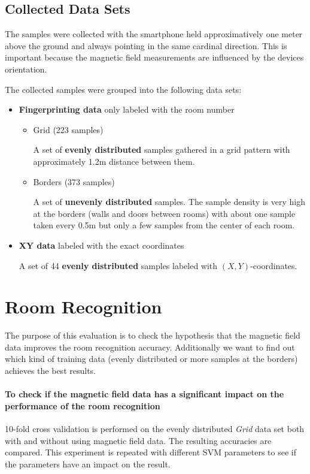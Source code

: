 \subsection{Collected Data Sets}

The samples were collected with the smartphone held approximatively one meter above the ground and always pointing in the same cardinal direction. This is important because the magnetic field measurements are influenced by the devices orientation.

The collected samples were grouped into the following data sets:

\begin{itemize}
\item \textbf{Fingerprinting data} only labeled with the room number
	\begin{itemize}
	\item Grid (223 samples)

	A set of \textbf{evenly distributed} samples gathered in a grid pattern with approximately 1.2m distance between them.
	\item Borders (373 samples)
	
	A set of \textbf{unevenly distributed} samples. The sample density is very high at the borders (walls and doors between rooms) with about one sample taken every 0.5m but only a few samples from the center of each room.
	\end{itemize}
 \item \textbf{XY data} labeled with the exact coordinates
 
 A set of 44 \textbf{evenly distributed} samples labeled with \((X,Y)\)-coordinates.
\end{itemize}

\section{Room Recognition}
\label{EvaluationRoomRecognition}

The purpose of this evaluation is to check the hypothesis that the magnetic field data improves the room recognition accuracy. Additionally we want to find out which kind of training data (evenly distributed or more samples at the borders) achieves the best results.

\paragraph{To check if the magnetic field data has a significant impact on the performance of the room recognition} 10-fold cross validation is performed on the evenly distributed \emph{Grid} data set both with and without using magnetic field data. The resulting accuracies are compared. This experiment is repeated with different SVM parameters to see if the parameters have an impact on the result. 


